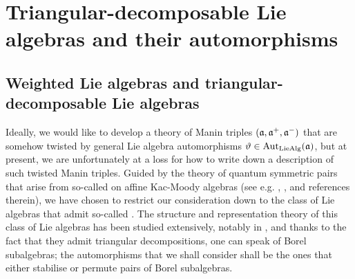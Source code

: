 \section{Triangular-decomposable Lie algebras and their automorphisms}
    \subsection{Weighted Lie algebras and triangular-decomposable Lie algebras}
        Ideally, we would like to develop a theory of Manin triples $(\mathfrak{a}, \mathfrak{a}^+, \mathfrak{a}^-)$ that are somehow twisted by general Lie algebra automorphisms $\vartheta \in \operatorname{Aut}_{\mathrm{Lie}\mathrm{Alg}}(\mathfrak{a})$, but at present, we are unfortunately at a loss for how to write down a description of such twisted Manin triples. Guided by the theory of quantum symmetric pairs that arise from so-called  on affine Kac-Moody algebras (see e.g. \cite{regelskis_vlaar_reflection_matrices_coideal_subalgebras}, \cite{kolb_kac_moody_QSPs}, and references therein), we have chosen to restrict our consideration down to the class of Lie algebras that admit so-called . The structure and representation theory of this class of Lie algebras has been studied extensively, notably in \cite{moody_pianzola_lie_algebras_with_triangular_decompositions}, and thanks to the fact that they admit triangular decompositions, one can speak of Borel subalgebras; the automorphisms that we shall consider shall be the ones that either stabilise or permute pairs of Borel subalgebras.
        
